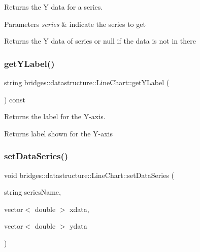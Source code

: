 Returns the Y data for a series. 


\begin{DoxyParams}{Parameters}
{\em series} & indicate the series to get \\
\hline
\end{DoxyParams}
\begin{DoxyReturn}{Returns}
the Y data of series or null if the data is not in there 
\end{DoxyReturn}
\mbox{\label{classbridges_1_1datastructure_1_1_line_chart_a682095169d9a7ce3899f129a13fd9616}} 
\subsubsection{\texorpdfstring{get\+Y\+Label()}{getYLabel()}}
{\footnotesize\ttfamily string bridges\+::datastructure\+::\+Line\+Chart\+::get\+Y\+Label (\begin{DoxyParamCaption}{ }\end{DoxyParamCaption}) const\hspace{0.3cm}{\ttfamily [inline]}}



Returns the label for the Y-\/axis. 

\begin{DoxyReturn}{Returns}
label shown for the Y-\/axis 
\end{DoxyReturn}
\mbox{\label{classbridges_1_1datastructure_1_1_line_chart_acb763ea4b2d0f27c73edc3861cc51fbb}} 
\subsubsection{\texorpdfstring{set\+Data\+Series()}{setDataSeries()}}
{\footnotesize\ttfamily void bridges\+::datastructure\+::\+Line\+Chart\+::set\+Data\+Series (\begin{DoxyParamCaption}\item[{string}]{series\+Name,  }\item[{vector$<$ double $>$}]{xdata,  }\item[{vector$<$ double $>$}]{ydata }\end{DoxyParamCaption})\hspace{0.3cm}{\ttfamily [inline]}}



